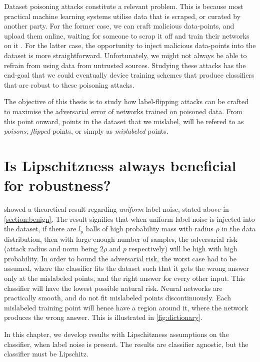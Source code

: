 \documentclass{ociamthesis}
\begin{document}
Dataset poisoning attacks constitute a relevant problem. This is because most
practical machine learning systems utilise data that is scraped, or curated by
another party. For the former case, we can craft malicious data-points, and
upload them online, waiting for someone to scrap it off and train their networks
on it \citep{transferable-clean-label-poisoning}. For the latter case, the
opportunity to inject malicious data-points into the dataset is more
straightforward. Unfortunately, we might not always be able to refrain from
using data from untrusted sources. Studying these attacks has the end-goal that
we could eventually device training schemes that produce classifiers that are
robust to these poisoning attacks.

The objective of this thesis is to study how label-flipping attacks can be
crafted to maximise the adversarial error of networks trained on poisoned data.
From this point onward, points in the dataset that we mislabel, will be refered
to as \emph{poisons}, \emph{flipped} points, or simply as \emph{mislabeled}
points.


\chapter{Is Lipschitzness always beneficial for robustness?}
\label{section:Lipschitzness-assumption}

\citet{sanyal2021how} showed a theoretical result regarding \emph{uniform} label
noise, stated above in \cref{section:benign}. The result signifies that when
uniform label noise is injected into the dataset, if there are $l_p$ balls of
high probability mass with radius $\rho$ in the data distribution, then with
large enough number of samples, the adversarial risk (attack radius and norm
being $2\rho$ and $p$ respectively) will be high with high probability. In order
to bound the adversarial risk, the worst case had to be assumed, where the
classifier fits the dataset such that it gets the wrong answer only at the
mislabeled points, and the right answer for every other input. This classifier
will have the lowest possible natural risk. Neural networks are practically
smooth, and do not fit mislabeled points discontinuously. Each mislabeled
training point will hence have a region around it, where the network produces
the wrong answer. This is illustrated in \cref{fig:dictionary}.

In this chapter, we develop results with Lipschitzness assumptions on the
classifier, when label noise is present. The results are classifier agnostic,
but the classifier must be Lipschitz.
\end{document}
